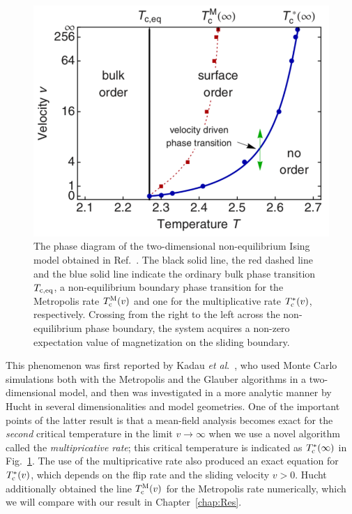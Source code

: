 \begin{figure}[htbp]
\centering
\includegraphics[width=0.5\linewidth]{Fig15.pdf}
\caption{The phase diagram of the two-dimensional non-equilibrium Ising model obtained in Ref.~\cite{Hucht2009b}\protect\footnotemark. The black solid line, the red dashed line and the blue solid line indicate the ordinary bulk phase transition $T_{\rm c,eq}$, a non-equilibrium boundary phase transition for the Metropolis rate $T_{\rm c}^{\rm M}(v)$ and one for the multiplicative rate $T_{\rm c}^{*}(v)$, respectively. Crossing from the right to the left across the non-equilibrium phase boundary, the system acquires a non-zero expectation value of magnetization on the sliding boundary.}
\label{fig:NEPTinIsing}
\end{figure}


This phenomenon was first reported by Kadau \textit{et al}.\ \cite{Kadau2008}, who used Monte Carlo simulations both with the Metropolis and the Glauber algorithms in a two-dimensional model, and then was investigated in a more analytic manner by Hucht \cite{Hucht2009b} in several dimensionalities and model geometries. One of the important points of the latter result is that a mean-field analysis becomes exact for the \textit{second} critical temperature in the limit $v\to \infty$ when we use a novel algorithm called the \textit{multipricative rate}; this critical temperature is indicated as $T^{*}_{\rm c}(\infty)$ in Fig.~\ref{fig:NEPTinIsing}. The use of the multipricative rate also produced an exact equation for $T^{*}_{\rm c}(v)$, which depends on the flip rate and the sliding velocity $v>0$. Hucht additionally obtained the line $T_{\rm c}^{\rm M}(v)$ for the Metropolis rate numerically, which we will compare with our result in Chapter~\ref{chap:Res}.

